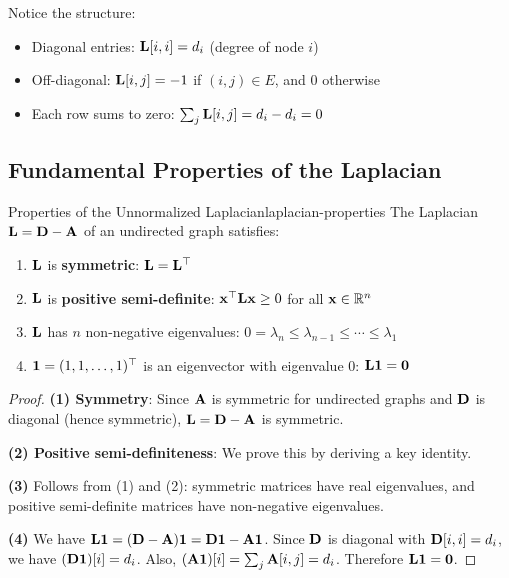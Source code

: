 \begin{notechapter}
\begin{example}
Notice the structure:
\begin{itemize}
    \item Diagonal entries: $\mathbf{L}[i,i] = d_i$ (degree of node $i$)
    \item Off-diagonal: $\mathbf{L}[i,j] = -1$ if $(i,j) \in E$, and $0$ otherwise
    \item Each row sums to zero: $\sum_j \mathbf{L}[i,j] = d_i - d_i = 0$
\end{itemize}
\end{example}

\subsection{Fundamental Properties of the Laplacian}

\begin{theorem}{Properties of the Unnormalized Laplacian}{laplacian-properties}
The Laplacian $\mathbf{L} = \mathbf{D} - \mathbf{A}$ of an undirected graph satisfies:
\begin{enumerate}
    \item $\mathbf{L}$ is \textbf{symmetric}: $\mathbf{L} = \mathbf{L}^\top$
    \item $\mathbf{L}$ is \textbf{positive semi-definite}: $\mathbf{x}^\top \mathbf{L} \mathbf{x} \geq 0$ for all $\mathbf{x} \in \mathbb{R}^n$
    \item $\mathbf{L}$ has $n$ non-negative eigenvalues: $0 = \lambda_n \leq \lambda_{n-1} \leq \cdots \leq \lambda_1$
    \item $\mathbf{1} = (1, 1, \ldots, 1)^\top$ is an eigenvector with eigenvalue $0$: $\mathbf{L} \mathbf{1} = \mathbf{0}$
\end{enumerate}
\end{theorem}

\begin{proof}
\textbf{(1) Symmetry}: Since $\mathbf{A}$ is symmetric for undirected graphs and $\mathbf{D}$ is diagonal (hence symmetric), $\mathbf{L} = \mathbf{D} - \mathbf{A}$ is symmetric.

\textbf{(2) Positive semi-definiteness}: We prove this by deriving a key identity.

\textbf{(3)} Follows from (1) and (2): symmetric matrices have real eigenvalues, and positive semi-definite matrices have non-negative eigenvalues.

\textbf{(4)} We have $\mathbf{L} \mathbf{1} = (\mathbf{D} - \mathbf{A})\mathbf{1} = \mathbf{D}\mathbf{1} - \mathbf{A}\mathbf{1}$. Since $\mathbf{D}$ is diagonal with $\mathbf{D}[i,i] = d_i$, we have $(\mathbf{D}\mathbf{1})[i] = d_i$. Also, $(\mathbf{A}\mathbf{1})[i] = \sum_j \mathbf{A}[i,j] = d_i$. Therefore $\mathbf{L}\mathbf{1} = \mathbf{0}$.
\end{proof}


\end{notechapter}
